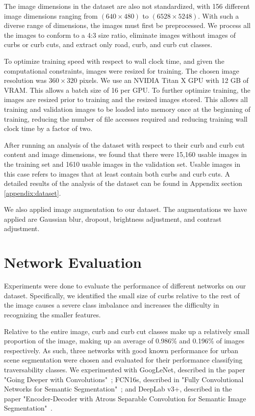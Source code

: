

The image dimensions in the dataset are also not standardized, with 156 different image dimensions ranging from $(640 \times 480)$ to $(6528 \times 5248)$. 
With such a diverse range of dimensions, the images must first be preprocessed.
We process all the images to conform to a 4:3 size ratio, eliminate images without images of curbs or curb cuts, and extract only road, curb, and curb cut classes.

To optimize training speed with respect to wall clock time, and given the computational constraints, images were resized for training.
The chosen image resolution was $360 \times 320$ pixels. 
We use an NVIDIA Titan X GPU with 12 GB of VRAM.
This allows a batch size of 16 per GPU.
To further optimize training, the images are resized prior to training and the resized images stored.
This allows all training and validation images to be loaded into memory once at the beginning of training, reducing the number of file accesses required and reducing training wall clock time by a factor of two.

After running an analysis of the dataset with respect to their curb and curb cut content and image dimensions, we found that there were 15,160 usable images in the training set and 1610 usable images in the validation set.
Usable images in this case refers to images that at least contain both curbs and curb cuts.
A detailed results of the analysis of the dataset can be found in Appendix section \ref{appendix:dataset}.

We also applied image augmentation to our dataset.
The augmentations we have applied are Gaussian blur, dropout, brightness adjustment, and contrast adjustment.

\section{Network Evaluation}\label{section:experiments-networkevaluation}
Experiments were done to evaluate the performance of different networks on our dataset.
Specifically, we identified the small size of curbs relative to the rest of the image causes a severe class imbalance and increases the difficulty in recognizing the smaller features.

Relative to the entire image, curb and curb cut classes make up a relatively small proportion of the image, making up an average of 0.986\% and 0.196\% of images respectively.
As such, three networks with good known performance for urban scene segmentation were chosen and evaluated for their performance classifying traversability classes.
We experimented with GoogLeNet, described in the paper "Going Deeper with Convolutions"~\cite{googlenet}; FCN16s, described in "Fully Convolutional Networks for Semantic Segmentation"~\cite{fcn}; and DeepLab v3+, described in the paper "Encoder-Decoder with Atrous Separable Convolution for Semantic Image Segmentation"~\cite{deeplab}.

